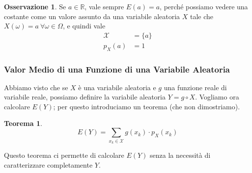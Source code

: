 \documentclass{article}
\theoremstyle{plain}
\newtheorem{teorema}{Teorema}[section]
\theoremstyle{definition}
\newtheorem{osservazione}{Osservazione}[section]
\theoremstyle{remark}
\begin{document}
\begin{osservazione}
	Se $a\in\mathds{R}$, vale sempre $E(a)=a$, perché possiamo vedere una costante come un valore assunto da una variabile aleatoria $X$ tale che $X(\omega)=a\ \forall\omega\in\Omega$, e quindi vale
	\begin{align*}
		\mathcal{X}&=\{a\}\\
		p_X(a)&=1
	\end{align*}
\end{osservazione}
\subsubsection{Valor Medio di una Funzione di una Variabile Aleatoria} %
\label{ssub:valor_medio_di_una_funzione_di_una_variabile_aleatoria}
Abbiamo visto che se $X$ è una variabile aleatoria e $g$ una funzione reale di variabile reale, possiamo definire la variabile aleatoria $Y=g\circ X$. Vogliamo ora calcolare $E(Y)$; per questo introduciamo un teorema (che non dimostriamo).
\begin{teorema}
	\begin{equation*}
		E(Y)=\sum_{x_k\in\mathcal{X}} g(x_k)\cdot p_X(x_k)
	\end{equation*}
\end{teorema}
Questo teorema ci permette di calcolare $E(Y)$ senza la necessità di caratterizzare completamente $Y$.
\end{document}
